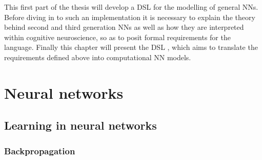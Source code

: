 \documentclass[report.tex]{subfiles}
\begin{document}
This first part of the thesis will develop a \gls{DSL} for
the modelling of general \gls{NN}s.
Before diving in to such an implementation it is necessary
to explain the theory behind second and third generation
\gls{NN}s as well as how they are interpreted within cognitive
neuroscience, so as to posit formal requirements for the language. 
Finally this chapter will present the \gls{DSL} ,
which aims to translate the requirements defined
above into computational \gls{NN} models.

\section{Neural networks}




\subsection{Learning in neural networks}

\subsubsection{Backpropagation}



\end{document}
